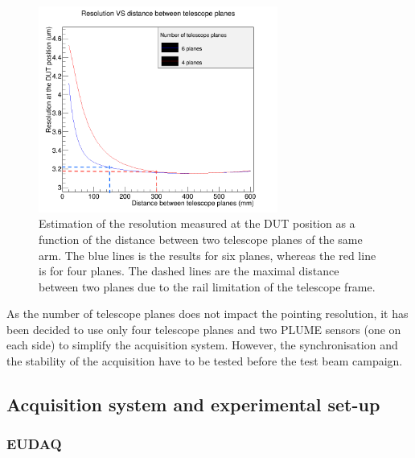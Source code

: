     \begin{figure}[!b]
      \centering
      \includegraphics[width = 0.7\textwidth]{Pictures/X0/resolution_4Vs6planes_4-7GeV.png}
      \caption{Estimation of the resolution measured at the DUT position as a function of the distance between two telescope planes of the same arm.
      The blue lines is the results for six planes, whereas the red line is for four planes. 
      The dashed lines are the maximal distance between two planes due to the rail limitation of the telescope frame.}
      \label{fig:estimationRes4.7GeV}
    \end{figure}

    As the number of telescope planes does not impact the pointing resolution, it has been decided to use only four telescope planes and two \gls{PLUME} sensors (one on each side) to simplify the acquisition system.
    However, the synchronisation and the stability of the acquisition have to be tested before the test beam campaign. 

    \subsection{Acquisition system and experimental set-up}
      
      \subsubsection{EUDAQ}

